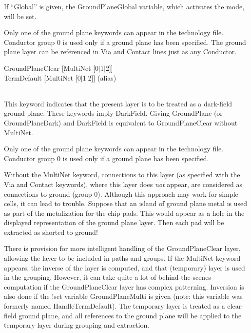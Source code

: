 \begin{description}
If ``{\vt Global}'' is given, the {\et GroundPlaneGlobal} variable,
which activates the mode, will be set.

Only one of the ground plane keywords can appear in the technology
file.  Conductor group 0 is used only if a ground plane has been
specified.  The ground plane layer can be referenced in {\et Via} and
{\et Contact} lines just as any {\et Conductor}.

\item\parbox[b]{4in}{\rr
{\et GroundPlaneClear} [{\et MultiNet} [0$|$1$|$2]]\\
{\et TermDefault} [{\et MultiNet} [0$|$1$|$2]] (alias)\\
}\\
This keyword indicates that the present layer is to be treated as a
dark-field ground plane.  These keywords imply {\et DarkField}. 
Giving {\et GroundPlane} (or {\et GroundPlaneDark}) and {\et
DarkField} is equivalent to {\et GroundPlaneClear} without {\et
MultiNet}.

Only one of the ground plane keywords can appear in the technology
file.  Conductor group 0 is used only if a ground plane has been
specified.

Without the {\et MultiNet} keyword, connections to this layer (as
specified with the {\et Via} and {\et Contact} keywords), where this
layer does {\it not} appear, are considered as connections to ground
(group 0).  Although this approach may work for simple cells, it can
lead to trouble.  Suppose that an island of ground plane metal is used
as part of the metalization for the chip pads.  This would appear as a
hole in the displayed representation of the ground plane layer.  Then
each pad will be extracted as shorted to ground!

There is provision for more intelligent handling of the {\et
GroundPlaneClear} layer, allowing the layer to be included in paths
and groups.  If the {\et MultiNet} keyword appears, the inverse of the
layer is computed, and that (temporary) layer is used in the grouping. 
However, it can take quite a lot of behind-the-scenes computation if
the {\et GroundPlaneClear} layer has complex patterning.  Inversion is
also done if the {\cb !set} variable {\et GroundPlaneMulti} is given
(note:  this variable was formerly named {\et HandleTermDefault}). 
The temporary layer is treated as a clear-field ground plane, and all
references to the ground plane will be applied to the temporary layer
during grouping and extraction.


\end{description}
